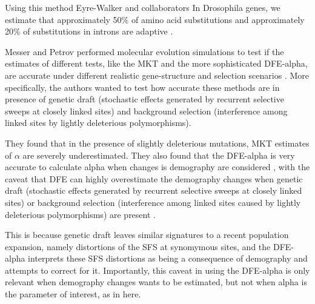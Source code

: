 Using this method Eyre-Walker and collaborators 
In Drosophila genes, we estimate
that approximately 50\% of amino acid substitutions and approximately 20\% of substitutions in introns are adaptive
	\citep{Eyre-Walker2009}.

Messer and Petrov performed molecular evolution simulations to test if the estimates of different tests, like the MKT and the more sophisticated DFE-alpha, are accurate under different realistic gene-structure and selection scenarios
	\citep{Messer2013}.
More specifically, the authors wanted to test how accurate these methods are in presence of genetic draft (stochastic effects generated by recurrent selective sweeps at closely linked sites)
and background selection (interference among linked sites by lightly deleterious polymorphisms).

They found that in the presence of slightly deleterious mutations, MKT estimates of $\alpha$ are severely underestimated.
They also found that the DFE-alpha is very accurate to calculate alpha when changes is demography are considered \citep{Messer2013}, with the caveat that DFE can highly overestimate the demography changes when genetic draft (stochastic effects generated by recurrent selective sweeps at closely linked sites) or background selection (interference among linked sites caused by lightly deleterious polymorphisms) are present \citep{Messer2013}.

This is because genetic draft leaves similar signatures to a recent population expansion, namely distortions of the SFS at synomymous sites, and the DFE-alpha interprets these SFS distortions as being a consequence of demography and attempts to correct for it.
Importantly, this caveat in using the DFE-alpha is only relevant when demography changes wants to be estimated, but not when alpha is the parameter of interest, as in here.
